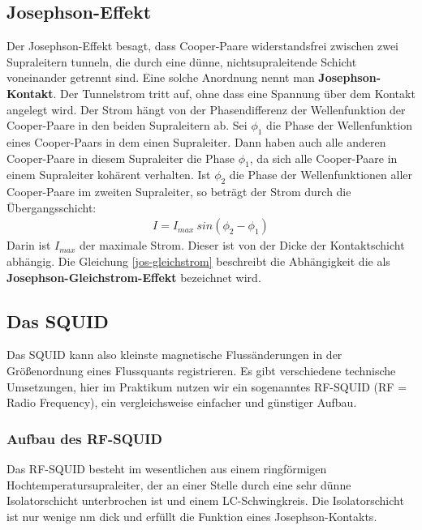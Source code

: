 \documentclass[12pt]{article}
\begin{document}
\subsection{Josephson-Effekt}
\label{josephson}

Der Josephson-Effekt besagt, dass Cooper-Paare widerstandsfrei zwischen zwei Supraleitern tunneln, die durch eine dünne, nichtsupraleitende Schicht voneinander getrennt sind. Eine solche Anordnung nennt man \textbf{Josephson-Kontakt}. Der Tunnelstrom tritt auf, ohne dass eine Spannung über dem Kontakt angelegt wird. Der Strom hängt von der Phasendifferenz der Wellenfunktion der Cooper-Paare in den beiden Supraleitern ab. Sei $\phi_1$ die Phase der Wellenfunktion eines Cooper-Paars in dem einen Supraleiter. Dann haben auch alle anderen Cooper-Paare in diesem Supraleiter die Phase $\phi_1$, da sich alle Cooper-Paare in einem Supraleiter kohärent verhalten. Ist $\phi_2$ die Phase der Wellenfunktionen aller Cooper-Paare im zweiten Supraleiter, so beträgt der Strom durch die Übergangsschicht:
\begin{align}
\label{jos-gleichstrom}
 I = I_{max}~sin(\phi_2 - \phi_1)
\end{align}
Darin ist $I_{max}$ der maximale Strom. Dieser ist von der Dicke der Kontaktschicht abhängig. Die Gleichung \ref{jos-gleichstrom} beschreibt die Abhängigkeit die als \textbf{Josephson-Gleichstrom-Effekt} bezeichnet wird.


\subsection{Das SQUID}

Das SQUID kann also kleinste magnetische Flussänderungen in der Größenordnung eines Flussquants registrieren. Es gibt verschiedene technische Umsetzungen, hier im Praktikum  nutzen wir ein sogenanntes RF-SQUID (RF = Radio Frequency),  ein vergleichsweise einfacher und günstiger Aufbau.

\subsubsection{Aufbau des RF-SQUID}

Das RF-SQUID besteht im wesentlichen aus einem ringförmigen Hochtemperatursupraleiter, der an einer Stelle durch eine sehr dünne Isolatorschicht unterbrochen ist und einem LC-Schwingkreis. Die Isolatorschicht ist nur wenige nm dick  und erfüllt die Funktion eines Josephson-Kontakts.
\end{document}
